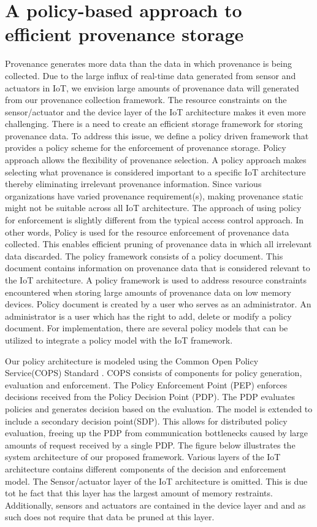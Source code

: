 \section{A policy-based approach to efficient provenance storage}
\par Provenance generates more data than the data in which provenance is being collected. Due to the large influx of real-time data generated from sensor and actuators in IoT, we envision large amounts of provenance data will generated from our provenance collection framework. The resource constraints on the sensor/actuator and the device layer of the IoT architecture makes it even more challenging. There is a need to create an efficient storage framework for storing provenance data. To address this issue, we define a policy driven framework that provides a policy scheme for the enforcement of provenance storage. Policy approach allows the flexibility of provenance selection. A policy approach makes selecting what provenance is considered important to a specific IoT architecture thereby eliminating irrelevant provenance information. Since various organizations have varied provenance requirement(s), making provenance static might not be suitable across all IoT architecture. The approach of using policy for enforcement is slightly different from the typical access control approach. In other words, Policy is used for the resource enforcement of provenance data collected. This enables efficient pruning of provenance data in which all irrelevant data discarded. The policy framework consists of a policy document. This document contains information on provenance data that is considered relevant to the IoT architecture. A policy framework is used to address resource constraints encountered when storing large amounts of provenance data on low memory devices. Policy document is created by a user who serves as an administrator.  An administrator is a user which has the right to add, delete or modify a policy document. For implementation, there are several policy models that can be utilized to integrate a policy model with the IoT framework. 

\par Our policy architecture is modeled using the Common Open Policy Service(COPS) Standard \cite{rfc2748}. COPS consists of components for policy generation, evaluation and enforcement. The Policy Enforcement Point (PEP) enforces decisions received from the Policy Decision Point (PDP). The PDP evaluates policies and generates decision based on the evaluation. The model is extended to include a secondary decision point(SDP). This allows for distributed policy evaluation, freeing up the PDP from communication bottlenecks caused by large amounts of request received by a single PDP.  The figure below illustrates the system architecture of our proposed framework. Various layers of the IoT architecture contains different components of the decision and enforcement model. The Sensor/actuator layer of the IoT architecture is omitted. This is due tot he fact that this layer has the largest amount of memory restraints. Additionally, sensors and actuators are contained in the device layer and and as such does not require that data be pruned at this layer. 

